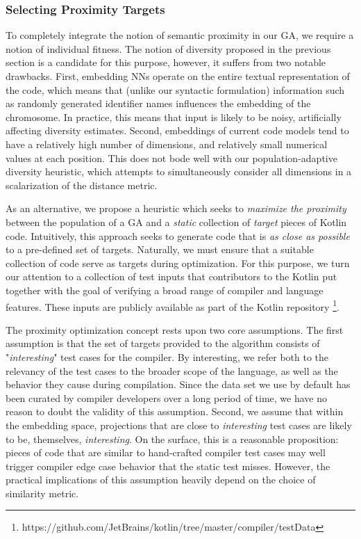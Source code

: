 \subsubsection{Selecting Proximity Targets}

To completely integrate the notion of semantic proximity 
in our \gls{GA}, we require a notion of individual fitness.
The notion of diversity proposed in the previous section is a candidate 
for this purpose, however, it suffers from two notable drawbacks.
First, embedding \gls{NN}s operate on the entire textual representation
of the code, which means that (unlike our syntactic formulation)
information such as randomly generated
identifier names influences the embedding of the chromosome.
In practice, this means that input is likely to be noisy, artificially
affecting diversity estimates.
Second, embeddings of current code models tend to have a 
relatively high number of dimensions, and relatively small numerical values
at each position.
This does not bode well with our population-adaptive
diversity heuristic, which attempts to simultaneously consider all dimensions
in a scalarization of the distance metric.

As an alternative, we propose a heuristic which seeks to \textit{maximize the proximity}
between the population of a \gls{GA} and a \textit{static} collection of \textit{target}
pieces of Kotlin code.
Intuitively, this approach seeks to generate code that is \textit{as close as possible}
to a pre-defined set of targets.
Naturally, we must ensure that a suitable collection of code serve as targets during optimization.
For this purpose, we turn our attention to a collection of test inputs that contributors
to the Kotlin put together with the goal of verifying a broad range of
compiler and language features.
These inputs are publicly available as part of the Kotlin repository
\footnote{https://github.com/JetBrains/kotlin/tree/master/compiler/testData}.

The proximity optimization concept rests upon two core assumptions.
The first assumption is that
the set of targets provided to the algorithm consists of "\textit{interesting}"
test cases for the compiler.
By interesting, we refer both to the relevancy of the test cases
to the broader scope of the language, as well as the behavior they
cause during compilation.
Since the data set we use by default has been curated by
compiler developers over a long period
of time, we have no reason to doubt the validity of this assumption.
Second, we assume that within the embedding space, projections
that are close to \textit{interesting} test cases are likely to be, themselves,
\textit{interesting}.
On the surface, this is a reasonable proposition: pieces of code
that are similar to hand-crafted compiler test cases
may well trigger compiler edge case behavior that
the static test misses.
However, the practical implications of this assumption
heavily depend on the choice of similarity metric.

